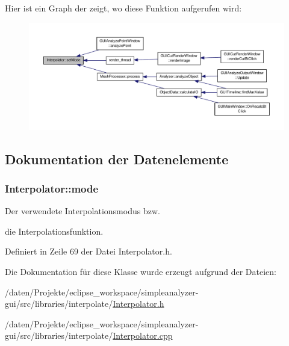 Hier ist ein Graph der zeigt, wo diese Funktion aufgerufen wird\-:\nopagebreak
\begin{figure}[H]
\begin{center}
\leavevmode
\includegraphics[width=350pt]{classInterpolator_a2f9927fc580de7d2f94d85e6ca3ee3e3_icgraph}
\end{center}
\end{figure}




\subsection{Dokumentation der Datenelemente}
\hypertarget{classInterpolator_ace34e7696bdf4a1f0544b145efee898e}{
\subsubsection[{mode}]{ Interpolator\-::mode\hspace{0.3cm}{\ttfamily [private]}}}\label{classInterpolator_ace34e7696bdf4a1f0544b145efee898e}


Der verwendete Interpolationsmodus bzw. 

die Interpolationsfunktion. 

Definiert in Zeile 69 der Datei Interpolator.\-h.



Die Dokumentation für diese Klasse wurde erzeugt aufgrund der Dateien\-:\begin{DoxyCompactItemize}
\item 
/daten/\-Projekte/eclipse\-\_\-workspace/simpleanalyzer-\/gui/src/libraries/interpolate/\hyperlink{Interpolator_8h}{Interpolator.\-h}\item 
/daten/\-Projekte/eclipse\-\_\-workspace/simpleanalyzer-\/gui/src/libraries/interpolate/\hyperlink{Interpolator_8cpp}{Interpolator.\-cpp}\end{DoxyCompactItemize}
